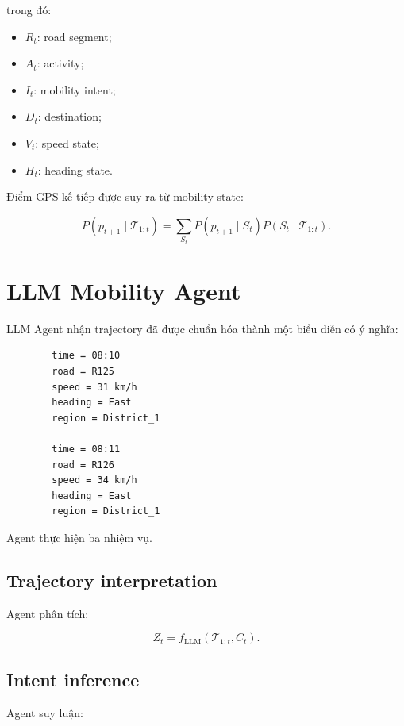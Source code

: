 \documentclass[11pt,a4paper]{article}
\begin{document}
	trong đó:
	
	\begin{itemize}
		\item $R_t$: road segment;
		\item $A_t$: activity;
		\item $I_t$: mobility intent;
		\item $D_t$: destination;
		\item $V_t$: speed state;
		\item $H_t$: heading state.
	\end{itemize}
	
	Điểm GPS kế tiếp được suy ra từ mobility state:
	
	\begin{equation}
		P(p_{t+1}\mid\mathcal{T}_{1:t})
		=
		\sum_{S_t}
		P(p_{t+1}\mid S_t)
		P(S_t\mid\mathcal{T}_{1:t}).
	\end{equation}
	
	\section{LLM Mobility Agent}
	
	LLM Agent nhận trajectory đã được chuẩn hóa thành một biểu diễn có ý
	nghĩa:
	
	\begin{verbatim}
		time = 08:10
		road = R125
		speed = 31 km/h
		heading = East
		region = District_1
		
		time = 08:11
		road = R126
		speed = 34 km/h
		heading = East
		region = District_1
	\end{verbatim}
	
	Agent thực hiện ba nhiệm vụ.
	
	\subsection{Trajectory interpretation}
	
	Agent phân tích:
	
	\begin{equation}
		Z_t
		=
		f_{\mathrm{LLM}}
		(
		\mathcal{T}_{1:t},
		C_t
		).
	\end{equation}
	
	\subsection{Intent inference}
	
	Agent suy luận:
	
\end{document}
